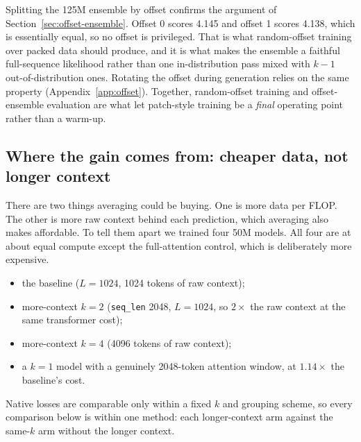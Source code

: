 \documentclass[11pt]{article}
\newcommand{\Ltr}{L}            %
\begin{document}
Splitting the 125M ensemble by offset confirms the argument of
Section~\ref{sec:offset-ensemble}. Offset 0 scores 4.145 and offset 1 scores
4.138, which is essentially equal, so no offset is privileged. That is what
random-offset training over packed data should produce, and it is what makes
the ensemble a faithful full-sequence likelihood rather than one
in-distribution pass mixed with $k{-}1$ out-of-distribution ones. Rotating
the offset during generation relies on the same property
(Appendix~\ref{app:offset}). Together, random-offset training and
offset-ensemble evaluation are what let patch-style training be a
\emph{final} operating point rather than a warm-up.

\subsection{Where the gain comes from: cheaper data, not longer context}
\label{sec:results-context}

There are two things averaging could be buying. One is more data per FLOP. The
other is more raw context behind each prediction, which averaging also makes
affordable. To tell them apart we trained four 50M models. All four are at
about equal compute except the full-attention control, which is deliberately
more expensive.

\begin{itemize}
  \item the baseline ($\Ltr{=}1024$, 1024 tokens of raw context);
  \item more-context $k{=}2$ (\texttt{seq\_len} 2048, $\Ltr{=}1024$, so
        $2\times$ the raw context at the same transformer cost);
  \item more-context $k{=}4$ (4096 tokens of raw context);
  \item a $k{=}1$ model with a genuinely 2048-token attention window, at
        $1.14\times$ the baseline's cost.
\end{itemize}

Native losses are comparable only within a fixed $k$ and grouping scheme, so
every comparison below is within one method: each longer-context arm against
the same-$k$ arm without the longer context.
\end{document}
